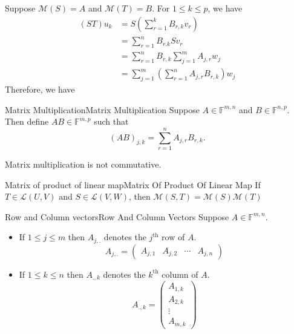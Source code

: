 \documentclass[../main.tex]{subfiles}
\begin{document}
Suppose $\mathscr{M}(S)=A$ and $\mathscr{M}(T)=B$. For $1\leq k\leq p$, we have
\begin{equation*}
\begin{aligned}
(ST)u_k &= S \left(\sum_{r=1}^{k} B_{r,k}v_r\right) \\
	&= \sum_{r=1}^{n} B_{r.k}Sv_r \\
	&= \sum_{r=1}^{n} B_{r,k} \sum_{j=1}^{m} A_{j,r}w_j \\
	&= \sum_{j=1}^{m} \left(\sum_{r=1}^{n} A_{j,r}B_{r,k}\right)w_j
\end{aligned}
\end{equation*}
Therefore, we have
\begin{definition}{Matrix Multiplication}{Matrix Multiplication}
Suppose $A \in \mathbb{F}^{m,n}$ and $B\in \mathbb{F}^{n,p}$. Then define $AB\in \mathbb{F}^{m,p}$ such that
\begin{equation}
	(AB)_{j,k} = \sum_{r=1}^{n} A_{j,r}B_{r,k}.
\end{equation}
\end{definition}
\begin{remark}
Matrix multiplication is not commutative.
\end{remark}

\begin{theorem}{Matrix of product of linear map}{Matrix Of Product Of Linear Map}
If $T\in \mathscr{L}(U,V)$ and $S\in \mathscr{L}(V,W)$, then $\mathscr{M}(S,T) = \mathscr{M}(S)\mathscr{M}(T)$
\end{theorem}

\begin{notation}{Row and Column vectors}{Row And Column Vectors}
Suppose $A\in \mathbb{F}^{m,n}$.
\begin{itemize}
\item If $1\leq j\leq m$ then $A_{j,.}$ denotes the $j^\text{th}$ row of $A$.
	\begin{equation*}
	A_{j,.} = 
	\begin{pmatrix}
		A_{j,1} & A_{j,2} & \cdots & A_{j,n}
	\end{pmatrix}
	\end{equation*}
\item If $1\leq k\leq n$ then $A_{.,k}$ denotes the $k^\text{th}$ column of $A$.
	\begin{equation*}
	A_{.,k} = 
	\begin{pmatrix}
	A_{1,k}\\A_{2,k}\\\vdots \\A_{m,k}
	\end{pmatrix}
	\end{equation*}
\end{itemize}
\end{notation}
\end{document}
